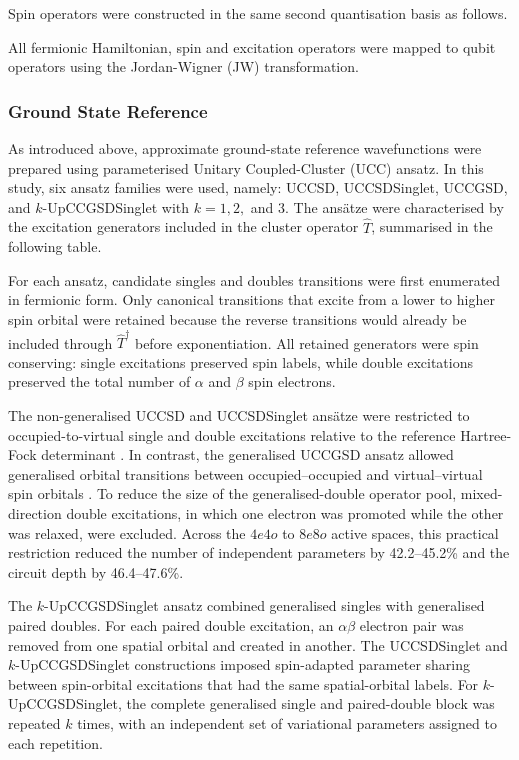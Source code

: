 Spin operators were constructed in the same second quantisation basis as follows.

\SpinZEquation
\SpinLadderOperatorsEquation
\SpinSquaredEquation

All fermionic Hamiltonian, spin and excitation operators were mapped to qubit operators using the Jordan-Wigner (JW) transformation.

\subsubsection{Ground State Reference}
As introduced above, approximate ground-state reference wavefunctions were prepared using parameterised Unitary Coupled-Cluster (UCC) ansatz. 
In this study, six ansatz families were used, namely: UCCSD, UCCSDSinglet, UCCGSD, and \(k\)-UpCCGSDSinglet with \(k=1,2,\) and \(3\). The ansätze were characterised by the excitation generators included in the cluster operator $\hat{T}$, summarised in the following table.



For each ansatz, candidate singles and doubles transitions were first enumerated in fermionic form. Only canonical transitions that excite from a lower to higher spin orbital were retained because the reverse transitions would already be included through $\hat{T}^{\dagger}$ before exponentiation. All retained generators were spin conserving: single excitations preserved spin labels, while double excitations preserved the total number of $\alpha$ and $\beta$ spin electrons. 

The non-generalised UCCSD and UCCSDSinglet ansätze were restricted to occupied-to-virtual single and double excitations relative to the reference Hartree-Fock determinant \cite{Anand2022UCCReview}. In contrast, the generalised UCCGSD ansatz allowed generalised orbital transitions between occupied--occupied and virtual--virtual spin orbitals \cite{Lee2018GeneralisedAnsatzOriginal, Diniz2021GeneralisedAnsatzAdaptations}.
To reduce the size of the generalised-double operator pool, mixed-direction double excitations, in which one electron was promoted while the other was relaxed, were excluded. Across the $4e4o$ to $8e8o$ active spaces, this practical restriction reduced the number of independent parameters by 42.2--45.2\% and the circuit depth by 46.4--47.6\%.

The $k$-UpCCGSDSinglet ansatz combined generalised singles with generalised paired doubles. For each paired double excitation, an $\alpha\beta$ electron pair was removed from one spatial orbital and created in another. 
The UCCSDSinglet and $k$-UpCCGSDSinglet constructions imposed spin-adapted parameter sharing between spin-orbital excitations that had the same spatial-orbital labels. 
For $k$-UpCCGSDSinglet, the complete generalised single and paired-double block was repeated $k$ times, with an independent set of variational parameters assigned to each repetition. 

